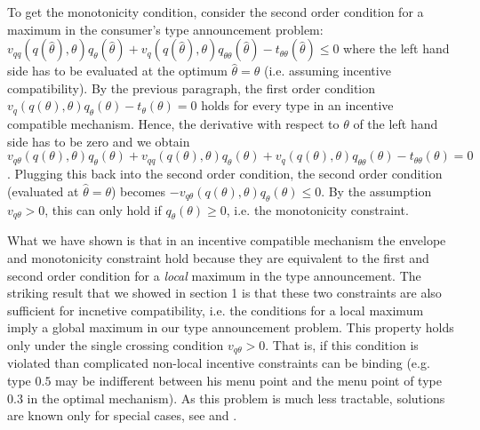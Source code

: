\documentclass[12pt]{article}
\begin{document}
To get the monotonicity condition, consider the second order condition for a maximum in the consumer's type announcement problem: $v_{qq}(q(\hat\theta ),\theta )q_\theta (\hat \theta)+v_{q}(q(\hat\theta ),\theta )q_{\theta \theta} (\hat \theta)-t_{\theta \theta} (\hat{ \theta })\leq0$ where the left hand side has to be evaluated at the optimum $\hat{\theta }=\theta $ (i.e. assuming incentive compatibility). By the previous paragraph, the first order condition $v_q(q(\theta ),\theta )q_\theta ( \theta)-t_\theta ({ \theta })=0$ holds for every type in an incentive compatible mechanism. Hence, the derivative with respect to $\theta $ of the left hand side has to be zero and we obtain $v_{q\theta }(q(\theta ),\theta )q_\theta (\theta )+v_{qq}(q(\theta ),\theta )q_\theta ( \theta)+v_{q}(q(\theta ),\theta )q_{\theta \theta} ( \theta)-t_{\theta \theta} ({ \theta })=0$. Plugging this back into the second order condition, the second order condition (evaluated at $\hat{\theta }=\theta $) becomes $-v_{q\theta }(q(\theta ),\theta )q_\theta (\theta )\leq 0$. By the assumption $v_{q\theta }>0$, this can only hold if $q_\theta (\theta )\geq 0$, i.e. the monotonicity constraint.

What we have shown is that in an incentive compatible mechanism the envelope and monotonicity constraint hold because they are equivalent to the first and second order condition for a \emph{local} maximum in the type announcement. The striking result that we showed in section 1 is that these two constraints are also sufficient for incnetive compatibility, i.e. the conditions for a local maximum imply a global maximum in our type announcement problem. This property holds only under the single crossing condition $v_{q\theta }>0$. That is, if this condition is violated than complicated non-local incentive constraints can be binding (e.g. type $0.5$ may be indifferent between his menu point and the menu point of type $0.3$ in the optimal mechanism). As this problem is much less tractable, solutions are known only for special cases, see \cite{araujo2010adverse} and \cite{schottmueller2015jet}.



\end{document}
